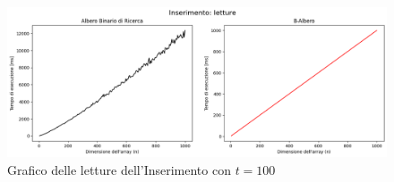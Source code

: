 \begin{figure}[H]
    \centering
    \includegraphics[width=\textwidth]{side-graphs/insert-r-t100.png}
    \caption{Grafico delle letture dell'Inserimento con $t=100$}
    \label{fig:sidegraphinsertread100}
\end{figure}
    
